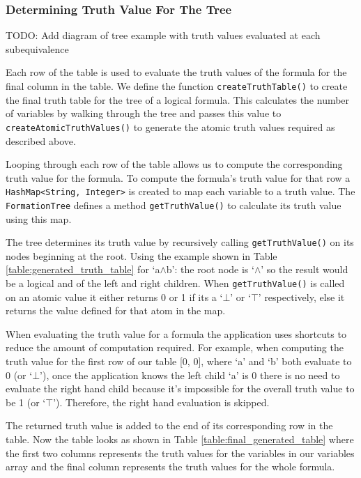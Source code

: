 \documentclass{report}
\begin{document}
\subsubsection{Determining Truth Value For The Tree}

TODO: Add diagram of tree example with truth values evaluated at each subequivalence

Each row of the table is used to evaluate the truth values of the formula for the final column in the table. We define the function {\tt createTruthTable()} to create the final truth table for the tree of a logical formula. This calculates the number of variables by walking through the tree and passes this value to {\tt createAtomicTruthValues()} to generate the atomic truth values required as described above. 

Looping through each row of the table allows us to compute the corresponding truth value for the formula. To compute the formula's truth value for that row a {\tt HashMap<String, Integer>} is created to map each variable to a truth value. The {\tt FormationTree} defines a method {\tt getTruthValue()} to calculate its truth value using this map.

The tree determines its truth value by recursively calling {\tt getTruthValue()} on its nodes beginning at the root. Using the example shown in Table \ref{table:generated_truth_table} for `a$\land$b': the root node is `$\land$' so the result would be a logical and of the left and right children. When {\tt getTruthValue()} is called on an atomic value it either returns 0 or 1 if its a `$\bot$' or `$\top$' respectively, else it returns the value defined for that atom in the map.

When evaluating the truth value for a formula the application uses shortcuts to reduce the amount of computation required. For example, when computing the truth value for the first row of our table [0, 0], where `a' and `b' both evaluate to 0 (or `$\bot$'), once the application knows the left child `a' is 0 there is no need to evaluate the right hand child because it's impossible for the overall truth value to be 1 (or `$\top$'). Therefore, the right hand evaluation is skipped.

The returned truth value is added to the end of its corresponding row in the table. Now the table looks as shown in Table \ref{table:final_generated_table} where the first two columns represents the truth values for the variables in our variables array and the final column represents the truth values for the whole formula.
\end{document}
